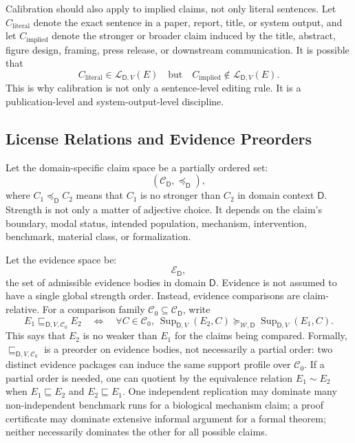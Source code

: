 \documentclass[11pt,a4paper]{article}
\newcommand{\Sup}{\operatorname{Sup}}
\newcommand{\Dom}{\mathsf{D}}
\begin{document}
Calibration should also apply to implied claims, not only literal sentences. Let $C_{\mathrm{literal}}$ denote the exact sentence in a paper, report, title, or system output, and let $C_{\mathrm{implied}}$ denote the stronger or broader claim induced by the title, abstract, figure design, framing, press release, or downstream communication. It is possible that
\begin{equation}
C_{\mathrm{literal}}\in\mathcal{L}_{\Dom,V}(E)
\quad\text{but}\quad
C_{\mathrm{implied}}\notin\mathcal{L}_{\Dom,V}(E).
\end{equation}
This is why calibration is not only a sentence-level editing rule. It is a publication-level and system-output-level discipline.

\subsection{License Relations and Evidence Preorders}

Let the domain-specific claim space be a partially ordered set:
\begin{equation}
(\mathcal{C}_{\Dom},\preceq_{\Dom}),
\end{equation}
where $C_1\preceq_{\Dom} C_2$ means that $C_1$ is no stronger than $C_2$ in domain context $\Dom$. Strength is not only a matter of adjective choice. It depends on the claim's boundary, modal status, intended population, mechanism, intervention, benchmark, material class, or formalization.

Let the evidence space be:
\begin{equation}
\mathcal{E}_{\Dom},
\end{equation}
the set of admissible evidence bodies in domain $\Dom$. Evidence is not assumed to have a single global strength order. Instead, evidence comparisons are claim-relative. For a comparison family $\mathcal{C}_0\subseteq\mathcal{C}_{\Dom}$, write
\[
E_1\sqsubseteq_{\Dom,V,\mathcal{C}_0}E_2
\quad\Longleftrightarrow\quad
\forall C\in\mathcal{C}_0,\ 
\Sup_{\Dom,V}(E_2,C)\succeq_{\mathcal{W},\Dom}\Sup_{\Dom,V}(E_1,C).
\]
This says that $E_2$ is no weaker than $E_1$ for the claims being compared. Formally, $\sqsubseteq_{\Dom,V,\mathcal{C}_0}$ is a preorder on evidence bodies, not necessarily a partial order: two distinct evidence packages can induce the same support profile over $\mathcal{C}_0$. If a partial order is needed, one can quotient by the equivalence relation $E_1\sim E_2$ when $E_1\sqsubseteq E_2$ and $E_2\sqsubseteq E_1$. One independent replication may dominate many non-independent benchmark runs for a biological mechanism claim; a proof certificate may dominate extensive informal argument for a formal theorem; neither necessarily dominates the other for all possible claims.
\end{document}
